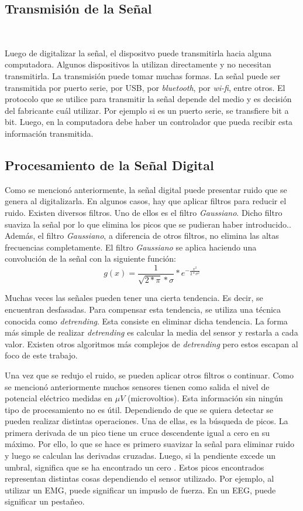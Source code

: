 \subsection{Transmisión de la Señal}\

Luego de digitalizar la señal, el dispositvo puede transmitirla hacia alguna computadora. Algunos dispositivos la utilizan directamente y no necesitan transmitirla. La transmisión puede tomar muchas formas. La señal puede ser transmitida por puerto serie, por USB, por \emph{bluetooth}, por \emph{wi-fi}, entre otros. El protocolo que se utilice para transmitir la señal depende del medio y es decisión del fabricante cuál utilizar. Por ejemplo si es un puerto serie, se transfiere bit a  bit. Luego, en la computadora debe haber un controlador que pueda recibir esta información transmitida.

\subsection{Procesamiento de la Señal Digital}

Como se mencionó anteriormente, la señal digital puede presentar ruido que se genera al digitalizarla. En algunos casos, hay que aplicar filtros para reducir el ruido. Existen diversos filtros. Uno de ellos es el filtro \emph{Gaussiano}. Dicho filtro suaviza la señal por lo que elimina los picos que se pudieran haber introducido.. Además, el filtro \emph{Gaussiano}, a diferencia de otros filtros, no elimina las altas frecuencias completamente. El filtro \emph{Gaussiano} se aplica haciendo una convolución de la señal con la siguiente función:
$$ g(x) = \frac{1}{\sqrt{2 * \pi} * \sigma } * e^{-\frac{x^{2}}{2 * \sigma^{2}}} $$

Muchas veces las señales pueden tener una cierta tendencia. Es decir, se encuentran desfasadas. Para compensar esta tendencia, se utiliza una técnica conocida como \emph{detrending}. Esta consiste en eliminar dicha tendencia.  La forma más simple de realizar \emph{detrending} es calcular la media del sensor y restarla a cada valor. Existen otros algoritmos más complejos de \emph{detrending} pero estos escapan al foco de este trabajo.

Una vez que se redujo el ruido, se pueden aplicar otros filtros o continuar. Como se mencionó anteriormente muchos sensores tienen como salida el nivel de potencial eléctrico medidas en $\mu V$ (microvoltios). Esta información sin ningún tipo de procesamiento no es útil. Dependiendo de que se quiera detectar se pueden realizar distintas operaciones. Una de ellas, es la búsqueda de picos. La primera derivada de un pico tiene un cruce descendente igual a cero en su máximo. Por ello, lo que se hace es primero suavizar la señal para eliminar ruido y luego se calculan las derivadas cruzadas. Luego, si la pendiente excede un umbral, significa que se ha encontrado un cero \cite{peak-finding}. Estos picos encontrados representan distintas cosas dependiendo el sensor utilizado. Por ejemplo, al utilizar un EMG, puede significar un impuslo de fuerza. En un EEG, puede significar un pestañeo.

